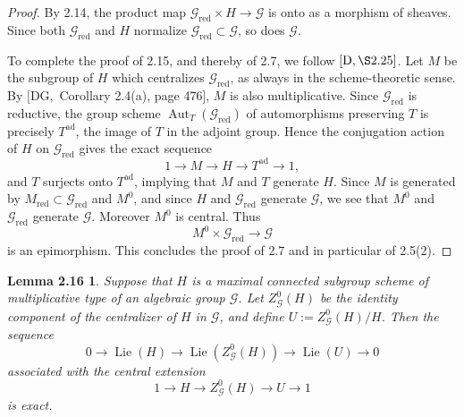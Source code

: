 \documentclass[11pt]{article}
\newcommand{\Lie}{\operatorname{Lie}}
\newcommand{\red}{\mathrm{red}}
\newtheorem*{lemma216}{Lemma 2.16}
\newcommand{\Aut}{\operatorname{Aut}}
\begin{document}
\begin{proof}
By 2.14, the product map \(\mathcal G_{\red}\times H\to \mathcal G\) is onto as a
morphism of sheaves. Since both \(\mathcal G_{\red}\) and \(H\) normalize
\(\mathcal G_{\red}\subset \mathcal G\), so does \(\mathcal G\).

To complete the proof of 2.15, and thereby of 2.7, we follow \([\mathrm D,\S2.25]\).
Let \(M\) be the subgroup of \(H\) which centralizes \(\mathcal G_{\red}\), as always in
the scheme-theoretic sense. By \([\mathrm{DG},\) Corollary 2.4(a), page 476], \(M\) is
also multiplicative. Since \(\mathcal G_{\red}\) is reductive, the group scheme
\(\Aut_T(\mathcal G_{\red})\) of automorphisms preserving \(T\) is precisely
\(T^{\mathrm{ad}}\), the image of \(T\) in the adjoint group. Hence the conjugation
action of \(H\) on \(\mathcal G_{\red}\) gives the exact sequence
\begin{equation}
  1\longrightarrow M\longrightarrow H\longrightarrow T^{\mathrm{ad}}\longrightarrow 1,
  \tag{2.15.1}
\end{equation}
and \(T\) surjects onto \(T^{\mathrm{ad}}\), implying that \(M\) and \(T\) generate
\(H\). Since \(M\) is generated by \(M_{\red}\subset \mathcal G_{\red}\) and \(M^0\),
and since \(H\) and \(\mathcal G_{\red}\) generate \(\mathcal G\), we see that \(M^0\)
and \(\mathcal G_{\red}\) generate \(\mathcal G\). Moreover \(M^0\) is central. Thus
\begin{equation}
  M^0\times \mathcal G_{\red}\longrightarrow \mathcal G
  \tag{2.15.2}
\end{equation}
is an epimorphism. This concludes the proof of 2.7 and in particular of 2.5(2).
\end{proof}

\begin{lemma216}
Suppose that \(H\) is a maximal connected subgroup scheme of multiplicative type of an
algebraic group \(\mathcal G\). Let \(Z^0_{\mathcal G}(H)\) be the identity component
of the centralizer of \(H\) in \(\mathcal G\), and define
\(U:=Z^0_{\mathcal G}(H)/H\). Then the sequence
\begin{equation}
0\longrightarrow \Lie(H)\longrightarrow \Lie(Z^0_{\mathcal G}(H))
\longrightarrow \Lie(U)\longrightarrow 0
\tag{2.16.1}
\end{equation}
associated with the central extension
\begin{equation}
1\longrightarrow H\longrightarrow Z^0_{\mathcal G}(H)\longrightarrow U
\longrightarrow 1
\tag{2.16.2}
\end{equation}
is exact.
\end{lemma216}
\end{document}
